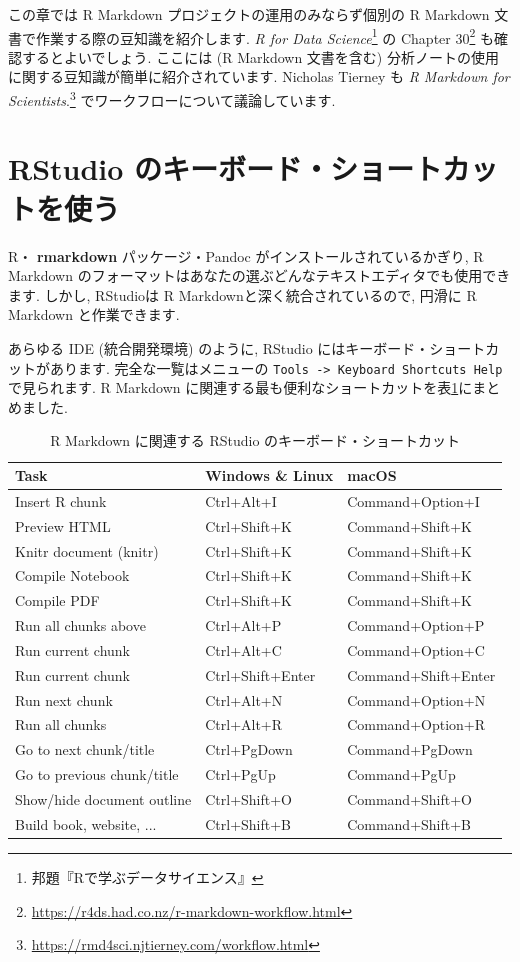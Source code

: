 \documentclass[
  11pt,
]{bxjsreport}
\renewcommand{\href}[2]{#2\footnote{\url{#1}}}
\begin{document}
この章では R Markdown プロジェクトの運用のみならず個別の R Markdown 文書で作業する際の豆知識を紹介します. \emph{R for Data Science}\footnote{邦題『Rで学ぶデータサイエンス』} \autocite{wickham2016} の \href{https://r4ds.had.co.nz/r-markdown-workflow.html}{Chapter 30} も確認するとよいでしょう. ここには (R Markdown 文書を含む) 分析ノートの使用に関する豆知識が簡単に紹介されています. Nicholas Tierney も \href{https://rmd4sci.njtierney.com/workflow.html}{\emph{R Markdown for Scientists}.} でワークフローについて議論しています.

\hypertarget{rstudio-shortcuts}{%
\section{RStudio のキーボード・ショートカットを使う}\label{rstudio-shortcuts}}

R・ \textbf{rmarkdown} パッケージ・Pandoc がインストールされているかぎり, R Markdown のフォーマットはあなたの選ぶどんなテキストエディタでも使用できます. しかし, RStudioは R Markdownと深く統合されているので, 円滑に R Markdown と作業できます.

あらゆる IDE (統合開発環境) のように, RStudio にはキーボード・ショートカットがあります. 完全な一覧はメニューの \texttt{Tools -\textgreater{}\ Keyboard\ Shortcuts\ Help} で見られます. R Markdown に関連する最も便利なショートカットを表\ref{tab:shortcuts}にまとめました.

\begin{table}

\caption{\label{tab:shortcuts}R Markdown に関連する RStudio のキーボード・ショートカット}
\centering
\begin{tabular}[t]{lll}
\toprule
Task & Windows \& Linux & macOS\\
\midrule
Insert R chunk & Ctrl+Alt+I & Command+Option+I\\
Preview HTML & Ctrl+Shift+K & Command+Shift+K\\
Knitr document (knitr) & Ctrl+Shift+K & Command+Shift+K\\
Compile Notebook & Ctrl+Shift+K & Command+Shift+K\\
Compile PDF & Ctrl+Shift+K & Command+Shift+K\\
\addlinespace
Run all chunks above & Ctrl+Alt+P & Command+Option+P\\
Run current chunk & Ctrl+Alt+C & Command+Option+C\\
Run current chunk & Ctrl+Shift+Enter & Command+Shift+Enter\\
Run next chunk & Ctrl+Alt+N & Command+Option+N\\
Run all chunks & Ctrl+Alt+R & Command+Option+R\\
\addlinespace
Go to next chunk/title & Ctrl+PgDown & Command+PgDown\\
Go to previous chunk/title & Ctrl+PgUp & Command+PgUp\\
Show/hide document outline & Ctrl+Shift+O & Command+Shift+O\\
Build book, website, ... & Ctrl+Shift+B & Command+Shift+B\\
\bottomrule
\end{tabular}
\end{table}
\end{document}
